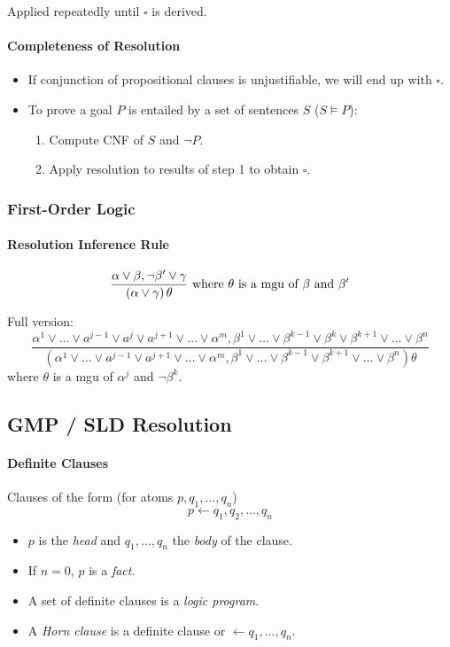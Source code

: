 \documentclass[twocolumn,english]{article}
\begin{document}
Applied repeatedly until $\square$ is derived.

\paragraph{Completeness of Resolution}
\begin{itemize}
\item If conjunction of propositional clauses is unjustifiable, we will
end up with $\square$.
\item To prove a goal $P$ is entailed by a set of sentences $S$ ($S\vDash P$):
\begin{enumerate}
\item Compute CNF of $S$ and $\lnot P$.
\item Apply resolution to results of step 1 to obtain $\square$.
\end{enumerate}
\end{itemize}

\subsubsection{First-Order Logic}

\paragraph{Resolution Inference Rule}

\[
\dfrac{\alpha\lor\beta,\lnot\beta'\lor\gamma}{\left(\alpha\lor\gamma\right)\theta}\text{ where \ensuremath{\theta} is a mgu of \ensuremath{\beta} and \ensuremath{\beta'}}
\]

Full version:
\[
\dfrac{\alpha^{1}\lor\dots\lor a^{j-1}\lor a^{j}\lor a^{j+1}\lor\dots\lor\alpha^{m},\beta^{1}\lor\dots\lor\beta^{k-1}\lor\beta^{k}\lor\beta^{k+1}\lor\dots\lor\beta^{n}}{\left(\alpha^{1}\lor\dots\lor a^{j-1}\lor a^{j+1}\lor\dots\lor\alpha^{m},\beta^{1}\lor\dots\lor\beta^{k-1}\lor\beta^{k+1}\lor\dots\lor\beta^{n}\right)\theta}
\]
where $\theta$ is a mgu of $\alpha^{j}$ and $\lnot\beta^{k}$.

\subsection{GMP / SLD Resolution}

\paragraph{Definite Clauses}

Clauses of the form (for atoms $p,q_{1},\dots,q_{n}$)
\[
p\leftarrow q_{1},q_{2},\dots,q_{n}
\]
\begin{itemize}
\item $p$ is the \emph{head} and $q_{1},\dots,q_{n}$ the \emph{body} of
the clause.
\item If $n=0$, $p$ is a \emph{fact}.
\item A set of definite clauses is a \emph{logic program}.
\item A \emph{Horn clause} is a definite clause or $\leftarrow q_{1},\dots,q_{n}$.
\end{itemize}
\end{document}
